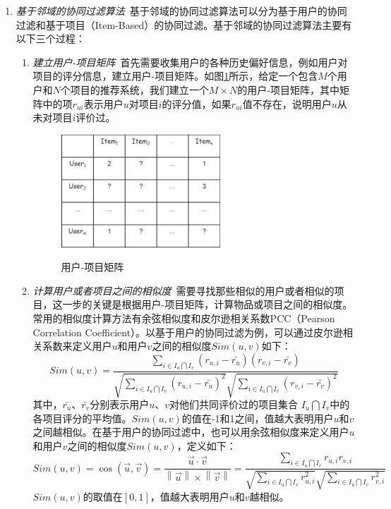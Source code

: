 \documentclass[master,winfonts]{njuthesis}
\begin{document}
\begin{enumerate}
\item \emph{基于邻域的协同过滤算法}~基于邻域的协同过滤算法可以分为基于用户的协同过滤和基于项目（Item-Based）的协同过滤。基于邻域的协同过滤算法主要有以下三个过程：
\begin{enumerate}
\item \emph{建立用户-项目矩阵}~首先需要收集用户的各种历史偏好信息，例如用户对项目的评分信息，建立用户-项目矩阵。如图\ref{fig:3}所示，给定一个包含$M$个用户和$N$个项目的推荐系统，我们建立一个$M\times N$的用户-项目矩阵，其中矩阵中的项$r_{ui}$表示用户$u$对项目$i$的评分值，如果$r_{ui}$值不存在，说明用户$u$从未对项目$i$评价过。
\begin{figure}[htbp]
  \centering
  \includegraphics[width=0.6\textwidth]{User-item-matrix.png}\\
  \caption{用户-项目矩阵}\label{fig:3}
\end{figure}
\item \emph{计算用户或者项目之间的相似度}~需要寻找那些相似的用户或者相似的项目，这一步的关键是根据用户-项目矩阵，计算物品或项目之间的相似度。常用的相似度计算方法有余弦相似度\cite{Breese1998Empirical}和皮尔逊相关系数PCC（Pearson Correlation Coefficient）。以基于用户的协同过滤为例，可以通过皮尔逊相关系数来定义用户$u$和用户$v$之间的相似度$Sim(u,v)$如下：
\begin{equation}
Sim(u,v)=\frac{\sum\limits_{i\in I_{u}\bigcap I_{v}}(r_{u,i}-\bar{r_{u}})(r_{v,i}-\bar{r_{v}})}{\sqrt{\sum\limits_{i\in I_{u}\bigcap I_{v}}(r_{u,i}-\bar{r_{u}})^{2}}\sqrt{\sum\limits_{i\in I_{u}\bigcap I_{v}}(r_{v,i}-\bar{r_{v}})^{2}}}
\end{equation}
其中，$\bar{r_{u}}$、$\bar{r_{v}}$分别表示用户$u$、$v$对他们共同评价过的项目集合 $I_{u}\bigcap I_{v}$中的各项目评分的平均值。$Sim(u,v)$的值在-1和1之间，值越大表明用户$u$和$v$之间越相似。在基于用户的协同过滤中，也可以用余弦相似度来定义用户$u$和用户$v$之间的相似度$Sim(u,v)$，定义如下：
\begin{equation}
Sim(u,v)=\cos(\vec{u},\vec{v}) =\frac{\vec{u}\cdot \vec{v}}{\left \| \vec{u} \right \|\times \left \| \vec{v} \right \|}=\frac{\sum\limits_{i\in I_{u}\bigcap I_{v}}r_{u,i}r_{v,i}}{\sqrt{\sum\limits_{i\in I_{u}\bigcap I_{v}}r_{u,i}^{2}}\sqrt{\sum\limits_{i\in I_{u}\bigcap I_{v}}r_{v,i}^{2}}}
\end{equation}
$Sim(u,v)$的取值在$[0,1]$，值越大表明用户$u$和$v$越相似。


\end{enumerate}
\end{enumerate}
\end{document}
